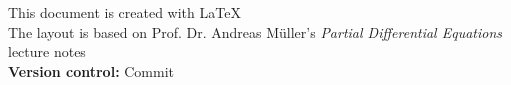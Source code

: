 \documentclass[a4paper,twoside,12pt]{book}
\begin{document}
\frontmatter


\mbox{}
\vfill
\begin{flushleft}
    This document is created with {\LaTeX} \\
    The layout is based on Prof. Dr. Andreas Müller's \textit{Partial Differential Equations} lecture notes \\
    \textbf{Version control:} Commit \commit
\end{flushleft}
\newpage




\tableofcontents


\mainmatter






\begin{appendices}
    
\end{appendices}



\end{document}
